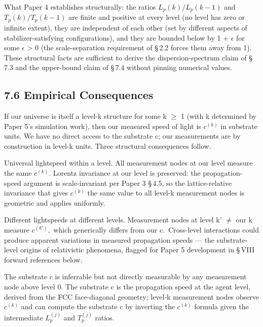 \documentclass[11pt,oneside]{report}
\theoremstyle{definition}
\theoremstyle{remark}
\begin{document}
What Paper 4 establishes structurally: the ratios \ensuremath{L_{p}(k)/L_{p}(k-1)} and
\ensuremath{T_{p}(k)/T_{p}(k-1)} are finite and positive at every level (no level has
zero or infinite extent), they are independent of each other (set by
different aspects of stabilizer-satisfying configurations), and they are
bounded below by 1 + \ensuremath{\epsilon} for some \ensuremath{\epsilon} \textgreater{} 0 (the scale-separation
requirement of \S\,2.2 forces them away from 1). These structural facts are
sufficient to derive the dispersion-spectrum claim of \S\,7.3 and the
upper-bound claim of \S\,7.4 without pinning numerical values.

\subsection*{7.6 Empirical Consequences}

If our universe is itself a level-k structure for some k \ensuremath{\geq} 1 (with k
determined by Paper 5's simulation work), then our measured speed of
light is \ensuremath{c^{(k)}} in substrate units. We have no direct access to the
substrate c; our measurements are by construction in level-k units.
Three structural consequences follow.

Universal lightspeed within a level. All measurement nodes at our level
measure the same \ensuremath{c^{(k)}.} Lorentz invariance at our level is preserved:
the propagation-speed argument is scale-invariant per Paper 3 \S\,4.5, so
the lattice-relative invariance that gives \ensuremath{c^{(k)}} the same value to
all level-k measurement nodes is geometric and applies uniformly.

Different lightspeeds at different levels. Measurement nodes at level k'
\ensuremath{\neq} our k measure \ensuremath{c^{(k')},} which generically differs from our
c.~Cross-level interactions could produce apparent variations in
measured propagation speeds --- the substrate-level origins of
relativistic phenomena, flagged for Paper 5 development in \S\,VIII forward
references below.

The substrate c is inferrable but not directly measurable by any
measurement node above level 0. The substrate c is the propagation speed
at the agent level, derived from the FCC face-diagonal geometry; level-k
measurement nodes observe \ensuremath{c^{(k)}} and can compute the substrate c by
inverting the \ensuremath{c^{(k)}} formula given the intermediate \ensuremath{L_{p}^{(j)}} and
\ensuremath{T_{p}^{(j)}} ratios.
\end{document}
